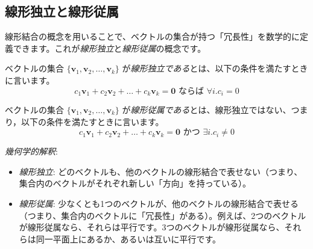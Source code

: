 \subsection{線形独立と線形従属}

線形結合の概念を用いることで、ベクトルの集合が持つ「冗長性」を数学的に定義できます。これが\emph{線形独立}と\emph{線形従属}の概念です。

\begin{dfn}[線形独立] \label{linear_independence}
ベクトルの集合 $\{\bm{v}_1, \bm{v}_2, \ldots, \bm{v}_k\}$ が\emph{線形独立である}とは、以下の条件を満たすときに言います。
\[c_1 \bm{v}_1 + c_2 \bm{v}_2 + \dots + c_k \bm{v}_k = \bm{0}\text{ ならば }\forall i.c_i=0\]
\end{dfn}

\begin{dfn}[線形従属] \label{linear_dependence}
ベクトルの集合 $\{\bm{v}_1, \bm{v}_2, \ldots, \bm{v}_k\}$ が\emph{線形従属である}とは、線形独立ではない、つまり，以下の条件を満たすときに言います。
\[c_1 \bm{v}_1 + c_2 \bm{v}_2 + \dots + c_k \bm{v}_k = \bm{0}\text{ かつ }\exists i. c_i\neq0\]
\end{dfn}

\emph{幾何学的解釈}:
\begin{itemize}
\item \emph{線形独立}: どのベクトルも、他のベクトルの線形結合で表せない（つまり、集合内のベクトルがそれぞれ新しい「方向」を持っている）。
\item \emph{線形従属}: 少なくとも1つのベクトルが、他のベクトルの線形結合で表せる（つまり、集合内のベクトルに「冗長性」がある）。例えば、2つのベクトルが線形従属なら、それらは平行です。3つのベクトルが線形従属なら、それらは同一平面上にあるか、あるいは互いに平行です。
\end{itemize}


